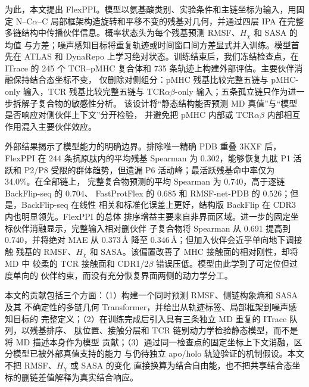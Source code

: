 为此，本文提出 FlexPPI。模型以氨基酸类别、实验条件和主链坐标为输入，用固定
N--C$\alpha$--C 局部框架构造旋转和平移不变的残基对几何，并通过四层 IPA 在完整
多链结构中传播伙伴信息。概率状态头为每个残基预测 RMSF、$H_\chi$ 和 SASA 的均值
与方差；噪声感知目标将重复轨迹或时间窗口间方差显式并入训练。模型首先在 ATLAS
和 DynaRepo 上学习绝对状态。训练结束后，我们冻结检查点，在 ITrace 的 245 个
TCR--pMHC 复合体和 735 条轨迹上构建外部评估。主要伙伴消融保持结合态坐标不变，
仅删除对侧组分：pMHC 残基比较完整五链与 pMHC-only 输入，TCR 残基比较完整五链与
TCR$\alpha\beta$-only 输入；五条孤立链只作为进一步拆解子复合物的敏感性分析。
该设计将“静态结构能否预测 MD 真值”与“模型是否响应对侧伙伴上下文”分开检验，
并避免把 pMHC 内部或 TCR$\alpha\beta$ 内部相互作用混入主要伙伴效应。

外部结果揭示了模型能力的明确边界。排除唯一精确 PDB 重叠 3KXF 后，FlexPPI 在
244 条抗原肽内的平均残基 Spearman 为 $0.302$，能够恢复九肽 P1 活跃和 P2/P8
受限的群体趋势，但遗漏 P6 活动峰；最活跃残基命中率仅为 34.0\%。在全部链上，
完整复合物预测的平均 Spearman 为 $0.740$，高于逐链 BackFlip-seq 的 $0.704$、
FastProtFlex 的 $0.685$ 和 RMSF-net-PDB 的 $0.526$；但是，BackFlip-seq 在线性
相关和标准化误差上更好，结构版 BackFlip 在 CDR3 内也明显领先。FlexPPI 的总体
排序增益主要来自非界面区域。进一步的固定坐标伙伴消融显示，完整输入相对删伙伴
子复合物将 Spearman 从 0.691 提高到 0.740，并将绝对 MAE 从
$0.373\,\text{\AA}$ 降至 $0.346\,\text{\AA}$；但加入伙伴会近乎单向地下调接触
残基的 RMSF、$H_\chi$ 和 SASA。该偏置改善了 MHC 接触面的相对刚性，却将 MD 中
较柔的 TCR 接触面和 CDR1/2$\beta$ 错误压低。模型由此学到了可定位但过度单向的
伙伴约束，而没有充分恢复界面两侧的动力学分工。

本文的贡献包括三个方面：（1）构建一个同时预测 RMSF、侧链构象熵和 SASA 及其
不确定性的多链几何 Transformer，并给出从轨迹标签、局部框架到噪声感知目标的
完整定义；（2）在训练完成后引入具有三条独立 MD 重复的 ITrace 队列，以残基排序、
肽位置、接触分层和 TCR 链别动力学检验静态模型，而不是将 MD 描述本身作为模型
贡献；（3）通过同一检查点的固定坐标上下文消融，区分模型已被外部真值支持的能力
与仍待独立 apo/holo 轨迹验证的机制假设。本文不把 RMSF、$H_\chi$ 或 SASA 的变化
直接换算为结合自由能，也不把共享结合态坐标的删链差值解释为真实结合响应。
